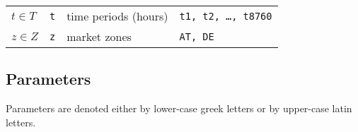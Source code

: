 \documentclass[review, 3p, times, 12pt, authoryear]{elsarticle}
\begin{document}
\begin{longtable}{p{}p{}p{}p{}}
        $t \in T$           & \texttt{t}         & time periods (hours)             & \texttt{t1, t2, \ldots, t8760}                                                                                                                                                                                                                                                                                                                                                                                                                          \\
        $z \in Z$           & \texttt{z}         & market zones                     & \texttt{AT, DE}                                                                                                                                                                                                                                                                                                                                                                                                                                         \\
    \end{longtable}

    \newpage

    \subsection{Parameters} \label{parameters}
    Parameters are denoted either by lower-case greek letters or by upper-case latin letters.
\end{document}
